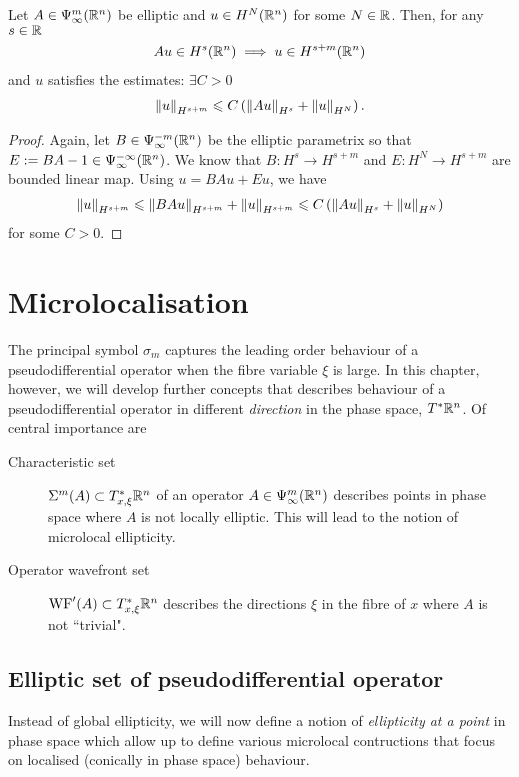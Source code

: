 \documentclass[12pt]{article}
\begin{document}
\begin{fprop}
    Let $A \in \Psi^{m}_{\infty}(\R^n)$ be elliptic and $u \in H^{N}(\R^n)$ for some $N \in \R$. Then, for any $s \in \R$
    \begin{align*}
    Au \in H^{s}(\R^n) \implies u \in H^{s + m}(\R^n)
    \end{align*}
    and $u$ satisfies the estimates: $\exists C > 0$
    \begin{align*}
    \norm[u]_{H^{s + m}} \leq C \brac{\norm[Au]_{H^s} + \norm[u]_{H^N}}. 
    \end{align*}
\end{fprop}
\begin{proof}
    Again, let $B \in \Psi^{-m}_{\infty}(\R^n)$ be the elliptic parametrix so that $E := BA - 1 \in \Psi^{-\infty}_{\infty}(\R^n)$. We know that $B : H^{s} \to H^{s + m}$ and  $E : H^N \to H^{s + m}$ are bounded linear map. Using $u = BAu + Eu$, we have
    \begin{align*}
     \norm[u]_{H^{s + m}} \leq \norm[BAu]_{H^{s + m}} + \norm[u]_{H^{s + m}} \leq C \brac{\norm[Au]_{H^s} + \norm[u]_{H^N}}
    \end{align*}
    for some $C > 0$. 
\end{proof}


\section{Microlocalisation}
The principal symbol $\sigma_m$ captures the leading order behaviour of a pseudodifferential operator when the fibre variable $\xi$ is large. In this chapter, however, we will develop further concepts that describes behaviour of a pseudodifferential operator in different \emph{direction} in the phase space, $T^*\R^n$. Of central importance are 
\begin{description}
    \item[Characteristic set] $\Char^m(A) \subset T^*_{x, \xi} \R^n$ of an operator $A \in \Psi^{m}_{\infty}(\R^n)$ describes points in phase space where $A$ is not locally elliptic. This will lead to the notion of microlocal ellipticity. 
    \item[Operator wavefront set] $\WF'(A) \subset T^*_{x, \xi} \R^n$ describes the directions $\xi$ in the fibre of $x$ where $A$ is not ``trivial". 
\end{description}


\subsection{Elliptic set of pseudodifferential operator}
Instead of global ellipticity, we will now define a notion of \textit{ellipticity at a point} in phase space which allow up to define various microlocal contructions that focus on  localised (conically in phase space) behaviour. 
\end{document}
